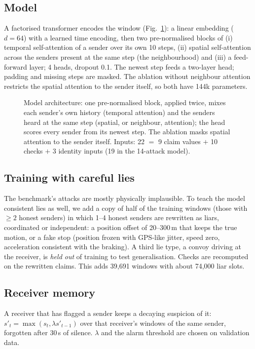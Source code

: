 \documentclass[conference]{IEEEtran}
\begin{document}
\subsection{Model}
A factorised transformer encodes the window (Fig.~\ref{fig:arch}): a linear embedding ($d{=}64$) with a learned time encoding, then two
pre-normalised blocks of (i) temporal self-attention of a sender over its own 10 steps, (ii) spatial self-attention across the senders present at
the same step (the neighbourhood) and (iii) a feed-forward layer; 4 heads, dropout 0.1. The newest step feeds a two-layer head; padding and
missing steps are masked. The ablation without neighbour attention restricts the spatial attention to the sender itself, so both have 144k
parameters.

\begin{figure}[t]\centering

\caption{Model architecture: one pre-normalised block, applied twice, mixes each sender's own history (temporal attention) and the senders
heard at the same step (spatial, or neighbour, attention); the head scores every sender from its newest step. The ablation masks spatial
attention to the sender itself. Inputs: 22 $=$ 9 claim values $+$ 10 checks $+$ 3 identity inputs (19 in the 14-attack model).}
\label{fig:arch}
\end{figure}

\subsection{Training with careful lies}
\label{sec:aug}
The benchmark's attacks are mostly physically implausible. To teach the model consistent lies as well, we add a copy of half of the training
windows (those with ${\geq}2$ honest senders) in which 1--4 honest senders are rewritten as liars, coordinated or independent: a position offset
of 20--300\,m that keeps the true motion, or a fake stop (position frozen with GPS-like jitter, speed zero, acceleration consistent with the
braking). A third lie type, a convoy driving at the receiver, is \emph{held out} of training to test generalisation. Checks are recomputed on
the rewritten claims. This adds 39,691 windows with about 74,000 liar slots.

\subsection{Receiver memory}
A receiver that has flagged a sender keeps a decaying suspicion of it: $s'_t=\max(s_t,\lambda s'_{t-1})$ over that receiver's windows of the same
sender, forgotten after 30\,s of silence. $\lambda$ and the alarm threshold are chosen on validation data.
\end{document}
